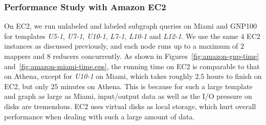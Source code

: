 \subsubsection{Performance Study with Amazon EC2}
\label{sec:experiments-ec2}

On EC2, we run unlabeled and labeled subgraph queries on Miami and GNP100 for
templates \emph{U5-1}, \emph{U7-1}, \emph{U10-1}, \emph{L7-1}, \emph{L10-1} and
\emph{L12-1}. We use the same $4$ EC2 instances as discussed previously, and
each node runs up to a maximum of $2$ mappers and $8$ reducers concurrently. As
shown in Figures~\ref{fig:amazon-gnp-time} and~\ref{fig:amazon-miami-time.eps},
the running time on EC2 is comparable to that on Athena, except for
\emph{U10-1} on Miami, which takes roughly $2.5$ hours to finish on EC2, but
only $25$ minutes on Athena. This is because for such a large template and
graph as large as Miami, input/output data as well as the I/O pressure on disks
are tremendous. EC2 uses virtual disks as local storage, which hurt overall
performance when dealing with such a large amount of data.

